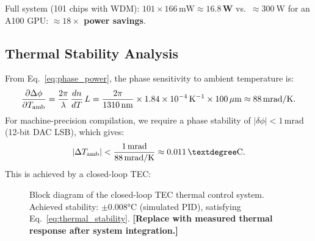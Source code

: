 \documentclass[12pt, a4paper]{article}
\begin{document}
Full system (101 chips with WDM):
$101 \times 166\,\mathrm{mW} \approx \mathbf{16.8\,W}$
vs.\ $\approx\SI{300}{\watt}$ for an A100 GPU:
\textbf{$\approx 18\times$ power savings}.

\subsection{Thermal Stability Analysis}

From Eq.~\eqref{eq:phase_power}, the phase sensitivity to ambient temperature
is:
\begin{equation}
  \frac{\partial\Delta\phi}{\partial T_{\rm amb}}
  = \frac{2\pi}{\lambda}\,\frac{dn}{dT}\,L
  = \frac{2\pi}{1310\,\mathrm{nm}}
    \times 1.84\times10^{-4}\,\mathrm{K}^{-1}
    \times 100\,\mathrm{\mu m}
  \approx 88\,\mathrm{mrad/K}.
  \label{eq:phase_sensitivity}
\end{equation}
For machine-precision compilation, we require a phase stability of
$|\delta\phi| < 1\,\mathrm{mrad}$ (12-bit DAC LSB), which gives:
\begin{equation}
  |\Delta T_{\rm amb}| < \frac{1\,\mathrm{mrad}}{88\,\mathrm{mrad/K}}
  \approx 0.011\,°\mathrm{C}.
  \label{eq:thermal_stability}
\end{equation}
This is achieved by a closed-loop TEC:

\begin{figure}[H]
\centering
{}
\caption{%
  Block diagram of the closed-loop TEC thermal control system.
  Achieved stability: $\pm 0.008$°C (simulated PID), satisfying
  Eq.~\eqref{eq:thermal_stability}.
  \textbf{[Replace with measured thermal response after system integration.]}%
}
\label{fig:tec_control}
\end{figure}
\end{document}
